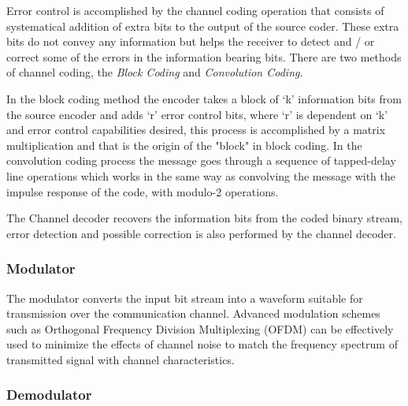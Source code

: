 Error control is accomplished by the channel coding operation that consists of
systematical addition of extra bits to the output of the source coder. These
extra bits do not convey any information but helps the receiver to detect and /
or correct some of the errors in the information bearing bits. There are two
methods of channel coding, the \textit{Block Coding} and \textit{Convolution
Coding}.

In the block coding method the encoder takes a block of ‘k’ information bits
from the source encoder and adds ‘r’ error control bits, where ‘r’ is dependent
on ‘k’ and error control capabilities desired, this process is accomplished by a
matrix multiplication and that is the origin of the "block" in block coding. In
the convolution coding process the message goes through a sequence of
tapped-delay line operations which works in the same way as convolving the
message with the impulse response of the code, with modulo-2 operations.

%
%
%


The Channel decoder recovers the information bits from the coded binary stream,
error detection and possible correction is also performed by the channel
decoder.

\subsubsection{Modulator}

The modulator converts the input bit stream into a waveform suitable for
transmission over the communication channel. Advanced modulation schemes such as
Orthogonal Frequency Division Multiplexing (OFDM) can be effectively used to
minimize the effects of channel noise to match the frequency spectrum of
transmitted signal with channel characteristics.

\subsubsection{Demodulator}

